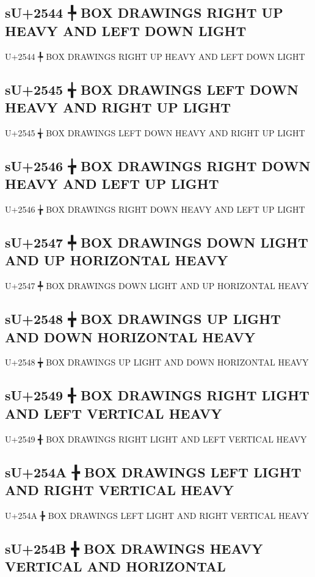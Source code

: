 \subsection{sU+2544 ╄ BOX DRAWINGS RIGHT UP HEAVY AND LEFT DOWN LIGHT}

U+2544 ╄ BOX DRAWINGS RIGHT UP HEAVY AND LEFT DOWN LIGHT

\subsection{sU+2545 ╅ BOX DRAWINGS LEFT DOWN HEAVY AND RIGHT UP LIGHT}

U+2545 ╅ BOX DRAWINGS LEFT DOWN HEAVY AND RIGHT UP LIGHT

\subsection{sU+2546 ╆ BOX DRAWINGS RIGHT DOWN HEAVY AND LEFT UP LIGHT}

U+2546 ╆ BOX DRAWINGS RIGHT DOWN HEAVY AND LEFT UP LIGHT

\subsection{sU+2547 ╇ BOX DRAWINGS DOWN LIGHT AND UP HORIZONTAL HEAVY}

U+2547 ╇ BOX DRAWINGS DOWN LIGHT AND UP HORIZONTAL HEAVY

\subsection{sU+2548 ╈ BOX DRAWINGS UP LIGHT AND DOWN HORIZONTAL HEAVY}

U+2548 ╈ BOX DRAWINGS UP LIGHT AND DOWN HORIZONTAL HEAVY

\subsection{sU+2549 ╉ BOX DRAWINGS RIGHT LIGHT AND LEFT VERTICAL HEAVY}

U+2549 ╉ BOX DRAWINGS RIGHT LIGHT AND LEFT VERTICAL HEAVY

\subsection{sU+254A ╊ BOX DRAWINGS LEFT LIGHT AND RIGHT VERTICAL HEAVY}

U+254A ╊ BOX DRAWINGS LEFT LIGHT AND RIGHT VERTICAL HEAVY

\subsection{sU+254B ╋ BOX DRAWINGS HEAVY VERTICAL AND HORIZONTAL}

